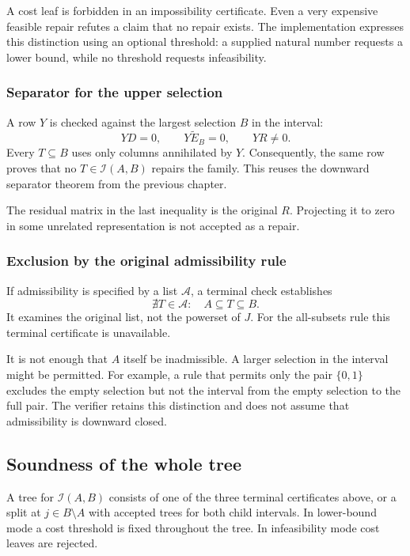 A cost leaf is forbidden in an impossibility certificate. Even a very expensive feasible repair refutes a claim that no repair exists. The implementation expresses this distinction using an optional threshold: a supplied natural number requests a lower bound, while no threshold requests infeasibility.

\subsubsection{Separator for the upper selection}

A row $Y$ is checked against the largest selection $B$ in the interval:
\[
 YD=0,\qquad Y\widetilde E_B=0,\qquad YR\ne0.
\]
Every $T\subseteq B$ uses only columns annihilated by $Y$. Consequently, the same row proves that no $T\in\mathcal I(A,B)$ repairs the family. This reuses the downward separator theorem from the previous chapter.

The residual matrix in the last inequality is the original $R$. Projecting it to zero in some unrelated representation is not accepted as a repair.

\subsubsection{Exclusion by the original admissibility rule}

If admissibility is specified by a list $\mathcal A$, a terminal check establishes
\[
 \nexists T\in\mathcal A:\quad A\subseteq T\subseteq B.
\]
It examines the original list, not the powerset of $J$. For the all-subsets rule this terminal certificate is unavailable.

It is not enough that $A$ itself be inadmissible. A larger selection in the interval might be permitted. For example, a rule that permits only the pair $\{0,1\}$ excludes the empty selection but not the interval from the empty selection to the full pair. The verifier retains this distinction and does not assume that admissibility is downward closed.

\subsection{Soundness of the whole tree}

\begin{CRdefinition}
A tree for $\mathcal I(A,B)$ consists of one of the three terminal certificates above, or a split at $j\in B\setminus A$ with accepted trees for both child intervals. In lower-bound mode a cost threshold is fixed throughout the tree. In infeasibility mode cost leaves are rejected.
\end{CRdefinition}

